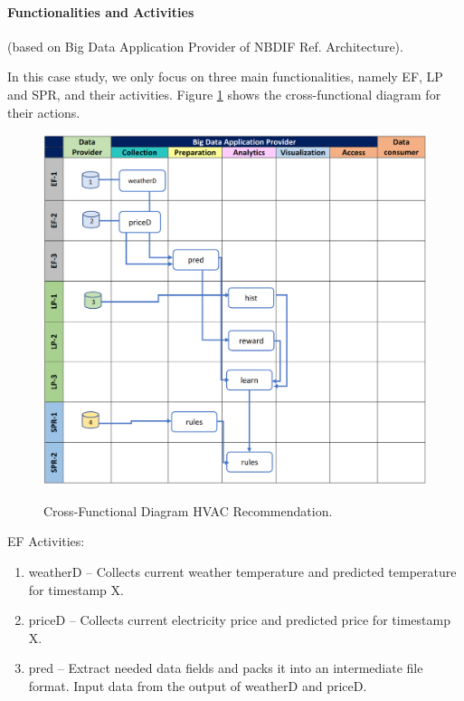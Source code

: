 \paragraph*{Functionalities and Activities} (based on Big Data Application Provider of NBDIF Ref. Architecture).

In this case study, we only focus on three main functionalities, namely EF, LP and SPR, and their activities. Figure \ref{fig:hvac2_func_diagram} shows the cross-functional diagram for their actions.



\begin{figure}[htb]
\centering\includegraphics[width=1.0\columnwidth]{usecase/hvac-2.png}
\label{fig:hvac2_func_diagram}
\caption{Cross-Functional Diagram HVAC Recommendation.}
\end{figure}


EF Activities:

\begin{enumerate}
\item weatherD -- Collects current weather temperature and predicted temperature for timestamp X.
\item priceD -- Collects current electricity price and predicted price for timestamp X.
\item pred -- Extract needed data fields and packs it into an intermediate file format. Input data from the output of weatherD and priceD.
\end{enumerate}


